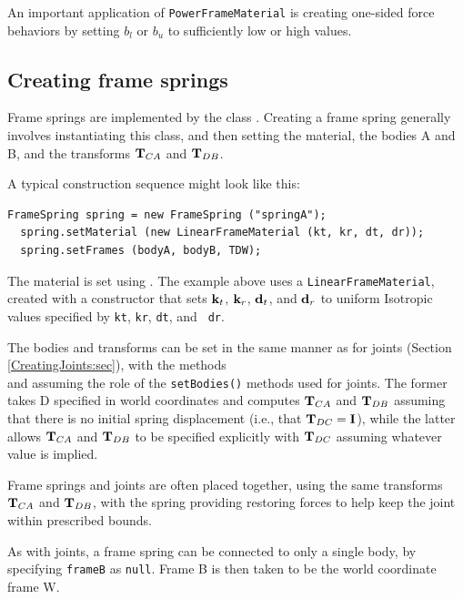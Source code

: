 An important application of {\tt PowerFrameMaterial} is creating one-sided
force behaviors by setting $b_l$ or $b_u$ to sufficiently low or high values.

\subsection{Creating frame springs}
\label{CreatingFrameSprings:sec}

Frame springs are implemented by the class
.  Creating a frame
spring generally involves instantiating this class, and then setting
the material, the bodies A and B, and the transforms ${\bf T}_{CA}$ and
${\bf T}_{DB}$.

A typical construction sequence might look like this:
%
\begin{lstlisting}[]
  FrameSpring spring = new FrameSpring ("springA");
  spring.setMaterial (new LinearFrameMaterial (kt, kr, dt, dr));
  spring.setFrames (bodyA, bodyB, TDW);
\end{lstlisting}
%
The material is set using
.
The example above uses a {\tt LinearFrameMaterial}, created with a
constructor that sets ${\bf k}_t$, ${\bf k}_r$, ${\bf d}_t$, and ${\bf d}_r$ to uniform
Isotropic values specified by {\tt kt}, {\tt kr}, {\tt dt}, and {\tt
dr}. 

The bodies and transforms can be set in the same manner as for joints
(Section \ref{CreatingJoints:sec}), with the
methods\\ 
and
assuming the role of the {\tt setBodies()} methods used for joints.
The former takes D specified in world coordinates and computes
${\bf T}_{CA}$ and ${\bf T}_{DB}$ assuming that there is no initial spring
displacement (i.e., that ${\bf T}_{DC} = {\bf I}$), while the latter allows
${\bf T}_{CA}$ and ${\bf T}_{DB}$ to be specified explicitly with ${\bf T}_{DC}$
assuming whatever value is implied.

Frame springs and joints are often placed together, using the same
transforms ${\bf T}_{CA}$ and ${\bf T}_{DB}$, with the spring providing
restoring forces to help keep the joint within prescribed bounds.

As with joints, a frame spring can be connected to only a single body,
by specifying {\tt frameB} as {\tt null}. Frame B is then taken to be
the world coordinate frame W.

